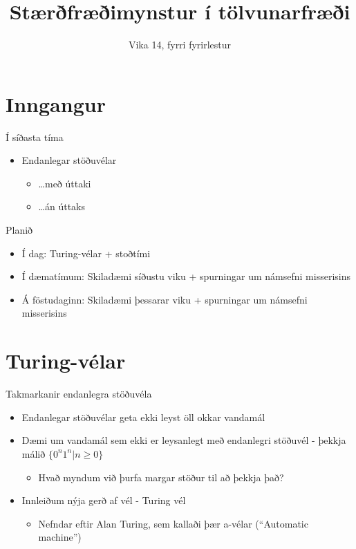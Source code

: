 \documentclass{beamer}
\title{Stærðfræðimynstur í tölvunarfræði}
\subtitle{Vika 14, fyrri fyrirlestur}
\begin{document}
\begin{frame}
\titlepage
\end{frame}


\section{Inngangur}

\begin{frame}{Í síðasta tíma}
\begin{itemize}
 \item Endanlegar stöðuvélar
 \begin{itemize}
  \item \ldots með úttaki
  \item \ldots án úttaks
 \end{itemize}
\end{itemize}
\end{frame}

\begin{frame}{Planið}
\begin{itemize}
 \item Í dag: Turing-vélar + stoðtími
 \item Í dæmatímum: Skiladæmi síðustu viku + spurningar um námsefni misserisins
 \item Á föstudaginn: Skiladæmi þessarar viku + spurningar um námsefni misserisins
\end{itemize}
\end{frame}


\section{Turing-vélar}

\begin{frame}{Takmarkanir endanlegra stöðuvéla}
\begin{itemize}
 \item Endanlegar stöðuvélar geta ekki leyst öll okkar vandamál
 \item Dæmi um vandamál sem ekki er leysanlegt með endanlegri stöðuvél - þekkja málið $\{0^n1^n | n\geq 0\}$
 \begin{itemize}
  \item Hvað myndum við þurfa margar stöður til að þekkja það?
 \end{itemize}
 \item Innleiðum nýja gerð af vél - Turing vél
 \begin{itemize}
  \item Nefndar eftir Alan Turing, sem kallaði þær a-vélar (``Automatic machine'')
 \end{itemize}
\end{itemize}
\end{frame}
\end{document}

